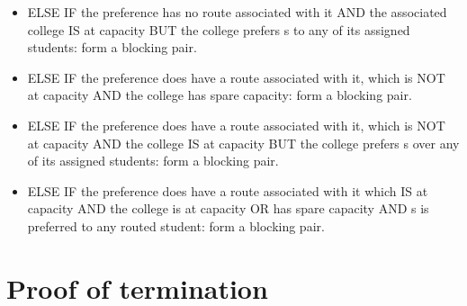\documentclass{article}
\begin{document}
\begin{enumerate}
\begin{itemize}
        \item ELSE IF the preference has no route associated with it AND the associated college IS at capacity BUT the college prefers s to any of its assigned students: form a blocking pair.
        \item ELSE IF the preference does have a route associated with it, which is NOT at capacity AND the college has spare capacity: form a blocking pair.
        \item ELSE IF the preference does have a route associated with it, which is NOT at capacity AND the college IS at capacity BUT the college prefers s over any of its assigned students: form a blocking pair.
        \item ELSE IF the preference does have a route associated with it which IS at capacity AND the college is at capacity OR has spare capacity AND s is preferred to any routed student: form a blocking pair.
    \end{itemize}
\end{enumerate}

\section{Proof of termination}
\end{document}
